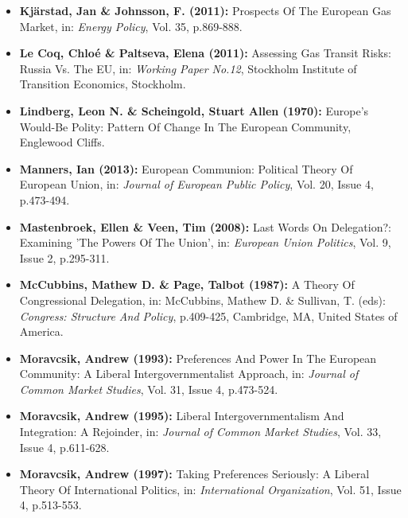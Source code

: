 \documentclass[11pt,a4paper,english]{scrreprt}
\begin{document}
\begin{itemize}
	\item [\Rectsteel] \textbf{Kj\"arstad, Jan \& Johnsson, F. (2011):}
Prospects Of The European Gas Market, in: \textsl{Energy Policy}, Vol. 35,
p.869-888.



	\item [\Rectsteel] \textbf{Le Coq, Chlo\'{e} \& Paltseva, Elena (2011):}
Assessing Gas Transit Risks: Russia Vs. The EU, in: \textsl{Working
Paper No.12}, Stockholm Institute of Transition Economics, Stockholm.



	\item [\Rectsteel] \textbf{Lindberg, Leon N. \& Scheingold, Stuart Allen
(1970):} Europe's Would-Be Polity: Pattern Of Change In The European Community,
Englewood Cliffs.




	\item [\Rectsteel] \textbf{Manners, Ian (2013):} European Communion:
Political Theory Of European Union, in: \textsl{Journal of European Public
Policy}, Vol. 20, Issue 4, p.473-494.



	\item [\Rectsteel] \textbf{Mastenbroek, Ellen \& Veen, Tim (2008):}
Last Words On Delegation?: Examining 'The Powers Of The Union', in:
\textsl{European Union Politics}, Vol. 9, Issue 2, p.295-311.



	\item [\Rectsteel] \textbf{McCubbins, Mathew D. \& Page, Talbot
(1987):} A Theory Of Congressional Delegation, in: McCubbins, Mathew
D. \& Sullivan, T. (eds): \textsl{Congress: Structure And Policy}, p.409-425,
Cambridge, MA, United States of America.


	
	\item [\Rectsteel] \textbf{Moravcsik, Andrew (1993):} Preferences And
Power In The European Community: A Liberal Intergovernmentalist Approach, in:
\textsl{Journal of Common Market Studies}, Vol. 31, Issue 4, p.473-524.	


	
	\item [\Rectsteel] \textbf{Moravcsik, Andrew (1995):} Liberal
Intergovernmentalism And Integration: A Rejoinder, in:
\textsl{Journal of Common Market Studies}, Vol. 33, Issue 4, p.611-628.



	\item [\Rectsteel] \textbf{Moravcsik, Andrew (1997):} Taking
Preferences Seriously: A Liberal Theory Of International Politics, in:
\textsl{International Organization}, Vol. 51, Issue 4, p.513-553.




\end{itemize}
\end{document}
